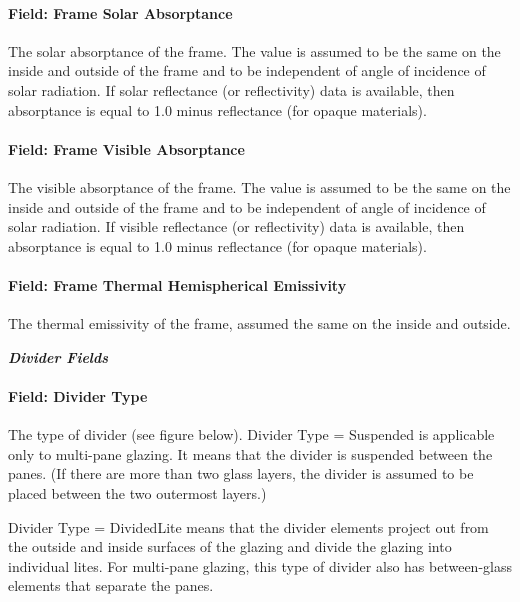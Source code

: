 \paragraph{Field: Frame Solar Absorptance}\label{field-frame-solar-absorptance}

The solar absorptance of the frame. The value is assumed to be the same on the inside and outside of the frame and to be independent of angle of incidence of solar radiation. If solar reflectance (or reflectivity) data is available, then absorptance is equal to 1.0 minus reflectance (for opaque materials).

\paragraph{Field: Frame Visible Absorptance}\label{field-frame-visible-absorptance}

The visible absorptance of the frame. The value is assumed to be the same on the inside and outside of the frame and to be independent of angle of incidence of solar radiation. If visible reflectance (or reflectivity) data is available, then absorptance is equal to 1.0 minus reflectance (for opaque materials).

\paragraph{Field: Frame Thermal Hemispherical Emissivity}\label{field-frame-thermal-hemispherical-emissivity}

The thermal emissivity of the frame, assumed the same on the inside and outside.

\textbf{\emph{Divider Fields}}

\paragraph{Field: Divider Type}\label{field-divider-type}

The type of divider (see figure below). Divider Type = Suspended is applicable only to multi-pane glazing. It means that the divider is suspended between the panes. (If there are more than two glass layers, the divider is assumed to be placed between the two outermost layers.)

Divider Type = DividedLite means that the divider elements project out from the outside and inside surfaces of the glazing and divide the glazing into individual lites. For multi-pane glazing, this type of divider also has between-glass elements that separate the panes.

